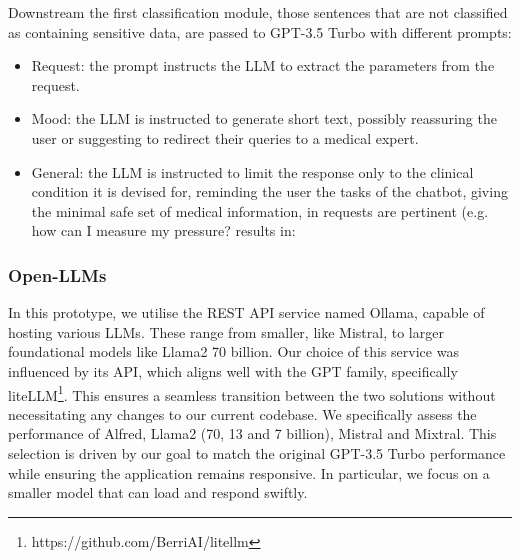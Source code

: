 \documentclass[preprint,12pt]{elsarticle}
\begin{document}
Downstream the first classification module, those sentences that are not classified as containing sensitive data, are passed to GPT-3.5 Turbo with different prompts: 
\begin{itemize}
    \item Request: the prompt instructs the LLM to extract the parameters from the request.
    \item Mood: the LLM is instructed to generate short text, possibly reassuring the user or suggesting to redirect their queries to a medical expert.
    \item General: the LLM is instructed to limit the response only to the clinical condition it is devised for, reminding the user the tasks of the chatbot, giving the minimal safe set of medical information, in requests are pertinent (e.g. how can I measure my pressure? results in:  
\end{itemize}

\subsubsection{Open-LLMs}
In this prototype, we utilise the REST API service named Ollama, capable of hosting various LLMs.
%
These range from smaller, like Mistral, to larger foundational models like Llama2 70 billion.
%
Our choice of this service was influenced by its API, which aligns well with the GPT family, specifically liteLLM\footnote{https://github.com/BerriAI/litellm}. This ensures a seamless transition between the two solutions without necessitating any changes to our current codebase.
%
We specifically assess the performance of Alfred, Llama2 (70, 13 and 7 billion), Mistral and Mixtral.
%
This selection is driven by our goal to match the original GPT-3.5 Turbo performance while ensuring the application remains responsive. 
%
In particular, we focus on a smaller model that can load and respond swiftly.
\end{document}
